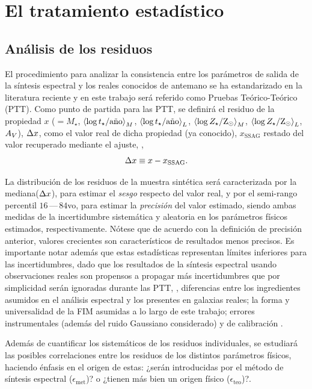 \section{El tratamiento estadístico}

\subsection{Análisis de los residuos}

El procedimiento para analizar la consistencia entre los parámetros de salida de la síntesis
espectral y los reales conocidos de antemano se ha estandarizado en la literatura reciente
\citep[\eg,][]{Lee2009, Wuyts2009, Pforr2012, Mitchell2013, Magris2015} y en este trabajo será
referido como Pruebas Teórico-Teórico (PTT). Como punto de partida para las PTT, se definirá el
residuo de la propiedad $x$ ($=M_\star$, $\mwla$, $\lwla$, $\mwlz$, $\lwlz$, $\extv$), $\res{x}$,
como el valor real de dicha propiedad (ya conocido), $x_\text{SSAG}$ restado del valor recuperado
mediante el ajuste, \ie,
%
\begin{equation}\label{ec:residual}
\res{x} \equiv x - x_\text{SSAG}.
\end{equation}

La distribución de los residuos de la muestra sintética será caracterizada por la
mediana($\res{x}$), para estimar el \emph{sesgo} respecto del valor real, y por el semi-rango
percentil $16\,$---$\,84$vo, para estimar la \emph{precisión} del valor estimado, siendo ambas
medidas de la incertidumbre sistemática y aleatoria en los parámetros físicos estimados,
respectivamente. Nótese que de acuerdo con la definición de precisión anterior, valores crecientes
son característicos de resultados menos precisos. Es importante notar además que estas estadísticas
representan límites inferiores para las incertidumbres, dado que los resultados de la síntesis
espectral usando observaciones reales son propensos a propagar más incertidumbres que por
simplicidad serán ignoradas durante las PTT, \eg, diferencias entre los ingredientes asumidos en el
análisis espectral y los presentes en galaxias reales; la forma y universalidad de la FIM asumidas a
lo largo de este trabajo; errores instrumentales (además del ruido Gaussiano considerado) y de
calibración \citep[véase][para una revisión más detallada]{Conroy2009, Conroy2010a}.

Además de cuantificar los sistemáticos de los residuos individuales, se estudiará las posibles
correlaciones entre los residuos de los distintos parámetros físicos, haciendo énfasis en el origen
de estas: ¿serán introducidas por el método de síntesis espectral ($\epsilon_\text{met}$)? o ¿tienen
más bien un origen físico ($\epsilon_\text{teo}$)?.

